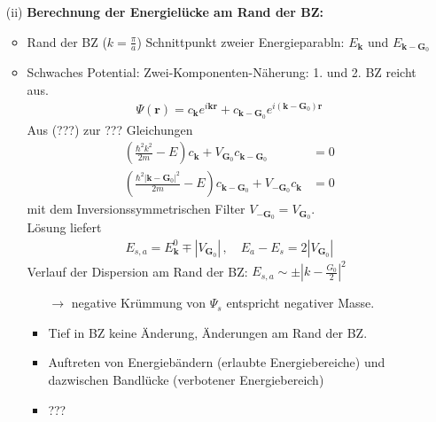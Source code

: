 \begin{itemize}
\begin{itemize}
            \item[(ii)] \textbf{Berechnung der Energielücke am Rand der BZ:}\\
            \begin{itemize}
                \item Rand der BZ ($k = \frac{\pi}{a}$) Schnittpunkt zweier Energieparabln: $E_{\textbf{k}}$ und $E_{\textbf{k}-\textbf{G}_0}$
                \item Schwaches Potential: Zwei-Komponenten-Näherung: 1. und 2. BZ reicht aus.
                \begin{align*}
                    \Psi(\textbf{r}) = c_{\textbf{k}} e^{i \textbf{k} \textbf{r}} + c_{\textbf{k}-\textbf{G}_0} e^{i(\textbf{k}-\textbf{G}_0) \textbf{r}}
                \end{align*}
                Aus (???) zur ??? Gleichungen
                \begin{align*}
                    \left(\frac{\hbar^2 k^2}{2m}-E\right) c_{\textbf{k}} + V_{\textbf{G}_0} c_{\textbf{k}-\textbf{G}_0} &= 0\\
                    \left(\frac{\hbar^2 \left|\textbf{k}-\textbf{G}_0\right|^2}{2m}-E\right) c_{\textbf{k}-\textbf{G}_0} + V_{-\textbf{G}_0} c_{\textbf{k}} &= 0
                \end{align*}
                mit dem Inversionssymmetrischen Filter $V_{-\textbf{G}_0} = V_{\textbf{G}_0}$.\\
                Lösung liefert
                \begin{align*}
                    E_{s,a} = E_{\textbf{k}}^0 \mp \left|V_{\textbf{G}_0} \right| \, , \quad E_a-E_s=2 \left|V_{\textbf{G}_0}\right|
                \end{align*}
                Verlauf der Dispersion am Rand der BZ: $E_{s,a} \sim \pm \left| k - \frac{G_0}{2} \right|^2$\\
                \begin{itemize}
                    \item[$\rightarrow$] negative Krümmung von $\Psi_s$ entspricht negativer Masse.
                    \item Tief in BZ keine Änderung, Änderungen am Rand der BZ.
                    \item Auftreten von Energiebändern (erlaubte Energiebereiche) und dazwischen Bandlücke (verbotener Energiebereich)
                    \item ???
                \end{itemize}
            \end{itemize}

\end{itemize}
\end{itemize}
